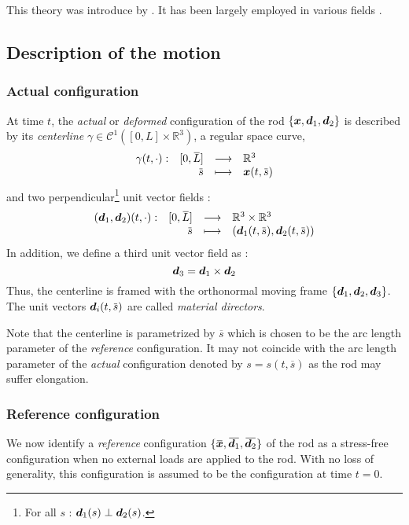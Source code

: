 This theory was introduce by \cite{Antman1974}. It has been largely employed in various fields \cite{Shi1995, Bergou2010}.

\subsection{Description of the motion}

\subsubsection{Actual configuration}

At time $t$, the \emph{actual} or \emph{deformed} configuration of the rod $\{{\boldsymbol{x}}, {\boldsymbol{d}_1}, {\boldsymbol{d}_2}\}$ is described by its \emph{centerline} $\gamma \in \mathcal{C}^1([0,{L}]\times \mathbb{R}^3)$, a regular space curve, 
\begin{equation}
	\fonctionL{\gamma(t, \cdot)}{[0,\overbar{L}]}{\mathbb{R}^3}{\overbar{s}}{\vect{x}(t,\overbar{s})}
\end{equation}
and two perpendicular\footnote{For all $s$ : $\boldsymbol{d}_1(s) \perp \boldsymbol{d}_2(s)$.} unit vector fields : 
\begin{equation}
	\fonctionL{(\vect{d}_1,\vect{d}_2)(t, \cdot)}{[0,\overbar{L}]}{\mathbb{R}^3 \times \mathbb{R}^3}{\overbar{s}}{(\vect{d}_1(t,\overbar{s}), \vect{d}_2(t,\overbar{s}))}
\end{equation}
In addition, we define a third unit vector field as : 
\begin{equation}
	\boldsymbol{d}_3 = \boldsymbol{d}_1 \times \boldsymbol{d}_2
\end{equation}
Thus, the centerline is framed with the orthonormal moving frame $\{\boldsymbol{d}_1, \boldsymbol{d}_2, \boldsymbol{d}_3\}$. The unit vectors $\vect{d}_i(t,\overbar{s})$ are called \emph{material directors}.

Note that the centerline is parametrized by $\overbar{s}$ which is chosen to be the arc length parameter of the \emph{reference} configuration. It may not coincide with the arc length parameter of the \emph{actual} configuration denoted by $s = s(t, \overbar{s})$ as the rod may suffer elongation.

\subsubsection{Reference configuration}
We now identify a \emph{reference} configuration $\{\overbar{\vect{x}}, \overbar{\vect{d}_1}, \overbar{\vect{d}_2}\}$ of the rod as a stress-free configuration when no external loads are applied to the rod. With no loss of generality, this configuration is assumed to be the configuration at time $t=0$. 

